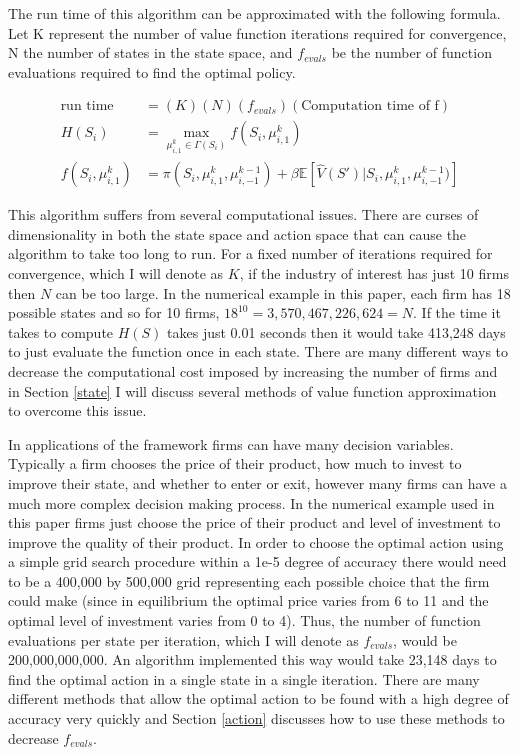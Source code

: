 \documentclass[12pt]{article}
\begin{document}
The run time of this algorithm can be approximated with the following formula. Let K represent the number of value function iterations required for convergence, N the number of states in the state space, and $f_{evals}$ be the number of function evaluations required to find the optimal policy.

\begin{equation}
  \label{runtime}
  \begin{split}
  \text{run time} &= (K)(N)(f_{evals})(\text{Computation time of f})\\
  H(S_i)&=\max_{\mu^k_{i,1} \in \Gamma(S_i)}f(S_i,\mu^k_{i,1})\\
  f(S_i,\mu^k_{i,1})&=\pi(S_i, \mu^k_{i,1}, \mu^{k-1}_{i,-1})+ \beta\mathbb{E}[\hat{V}(S')|S_i,\mu^k_{i,1},\mu^{k-1}_{i,-1})]
  \end{split}
\end{equation}

This algorithm suffers from several computational issues. There are curses of dimensionality in both the state space and action space that can cause the algorithm to take too long to run. For a fixed number of iterations required for convergence, which I will denote as $K$, if the industry of interest has just 10 firms then $N$ can be too large. In the numerical example in this paper, each firm has 18 possible states and so for 10 firms, $18^{10}=3,570,467,226,624=N$. If the time it takes to compute $H(S)$ takes just 0.01 seconds then it would take 413,248 days to just evaluate the function once in each state. There are many different ways to decrease the computational cost imposed by increasing the number of firms and in Section \ref{state} I will discuss several methods of value function approximation to overcome this issue.

In applications of the \citet{1995_Erickson_Pakes_RES} framework firms can have many decision variables. Typically a firm chooses the price of their product, how much to invest to improve their state, and whether to enter or exit, however many firms can have a much more complex decision making process. In the numerical example used in this paper firms just choose the price of their product and level of investment to improve the quality of their product. In order to choose the optimal action using a simple grid search procedure within a 1e-5 degree of accuracy there would need to be a 400,000 by 500,000 grid representing each possible choice that the firm could make (since in equilibrium the optimal price varies from 6 to 11 and the optimal level of investment varies from 0 to 4). Thus, the number of function evaluations per state per iteration, which I will denote as $f_{evals}$, would be 200,000,000,000. An algorithm implemented this way would take 23,148 days to find the optimal action in a single state in a single iteration. There are many different methods that allow the optimal action to be found with a high degree of accuracy very quickly and Section \ref{action} discusses how to use these methods to decrease $f_{evals}$.
\end{document}
